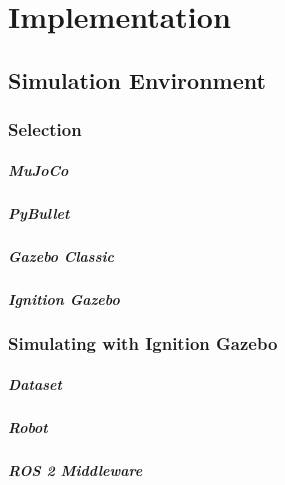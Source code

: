 \chapter{Implementation}\label{ch:implementation}




\section{Simulation Environment}

\subsection{Selection}
\paragraph{MuJoCo}
\paragraph{PyBullet}
\paragraph{Gazebo Classic}
\paragraph{Ignition Gazebo}

\subsection{Simulating with Ignition Gazebo}
\paragraph{Dataset}
\paragraph{Robot}
\paragraph{ROS 2 Middleware}
